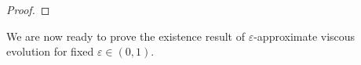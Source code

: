 \documentclass[reqno]{amsart}
\theoremstyle{definition}
\numberwithin{equation}{section}
\def\de {\mathrm{d}}
\def\R {\mathbb R}
\def\N {\mathbb N}
\begin{document}
\begin{proof}
\end{proof}

We are now ready to prove the existence result of $\varepsilon$-approximate viscous evolution for fixed $\varepsilon\in(0,1)$. 
\end{document}
